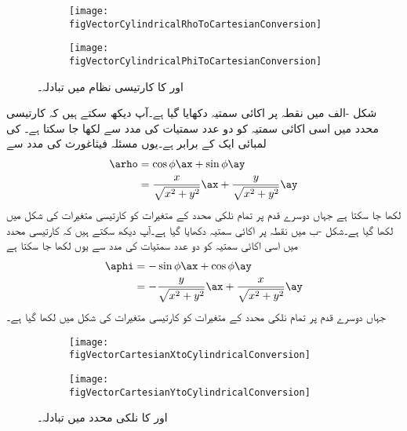 %
\begin{figure}
\centering
\begin{subfigure}{0.4\textwidth}
\centering
\texttt{[image: figVectorCylindricalRhoToCartesianConversion]}
\end{subfigure}%
%
\begin{subfigure}{0.4\textwidth}
\centering
\texttt{[image: figVectorCylindricalPhiToCartesianConversion]}
\end{subfigure}%
\caption{ اور  کا کارتیسی نظام میں تبادلہ۔}
\label{شکل_سمتیہ_کارتیسی_نظام_میں_نلکی_رداس_اکائی}
\end{figure}%

شکل -الف میں نقطہ  پر اکائی سمتیہ  دکھایا گیا ہے۔آپ دیکھ سکتے ہیں کہ کارتیسی محدد میں اسی اکائی سمتیہ کو دو عدد سمتیات کی مدد سے لکھا جا سکتا ہے۔ کی لمبائی ایک کے برابر ہے۔یوں مسئلہ فیثاغورث کی مدد سے
\begin{gather}
\begin{aligned}\label{مساوات_سمتیہ_اکائی_رداس_کارتیسی_میں}
\arho&=\cos \phi \ax+\sin \phi \ay\\
&=\frac{x}{\sqrt{x^2+y^2}} \ax+\frac{y}{\sqrt{x^2+y^2}} \ay
\end{aligned}
\end{gather}
 لکھا جا سکتا ہے جہاں دوسرے قدم پر تمام نلکی محدد کے متغیرات کو کارتیسی متغیرات کی شکل میں لکھا گیا ہے۔شکل -ب میں نقطہ  پر اکائی سمتیہ  دکھایا گیا ہے۔آپ دیکھ سکتے ہیں کہ کارتیسی محدد میں اسی اکائی سمتیہ کو دو عدد سمتیات کی مدد سے یوں  لکھا جا سکتا ہے
\begin{gather}
\begin{aligned}\label{مساوات_سمتیہ_اکائی_زاویہ_کارتیسی_میں}
\aphi&=-\sin \phi \ax+\cos \phi \ay\\
&=-\frac{y}{\sqrt{x^2+y^2}} \ax+\frac{x}{\sqrt{x^2+y^2}} \ay
\end{aligned}
\end{gather}
جہاں دوسرے قدم پر تمام نلکی محدد کے متغیرات کو کارتیسی متغیرات کی شکل میں لکھا گیا ہے۔
%
\begin{figure}
\centering
\begin{subfigure}{0.4\textwidth}
\centering
\texttt{[image: figVectorCartesianXtoCylindricalConversion]}
\end{subfigure}%
%
\begin{subfigure}{0.4\textwidth}
\centering
\texttt{[image: figVectorCartesianYtoCylindricalConversion]}
\end{subfigure}%
\caption{ اور  کا نلکی محدد میں تبادلہ۔}
\label{شکل_سمتیہ_نلکی_محدد_میں_کارتیسی_اکائی_سمتیات}
\end{figure}%


